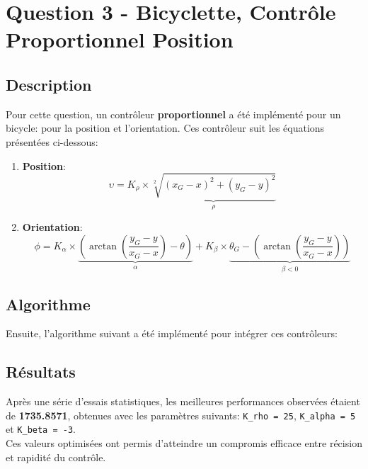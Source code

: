 \documentclass[../CSC_5RO16_TA_TP3.tex]{subfiles}
\begin{document}
\section{Question 3 - Bicyclette, Contrôle Proportionnel Position}

\subsection{Description}
\noindent Pour cette question, un contrôleur \textbf{proportionnel} a été implémenté pour un bicycle: pour la position et l'orientation. Ces contrôleur suit les équations présentées ci-dessous:
\begin{enumerate}
    \item \textbf{Position}:
    \begin{equation}
        \upsilon = K_{\rho} \times \underbrace{\sqrt[2]{(x_{G} - x)^2 + (y_{G} - y)^2}}_{\rho}
    \end{equation}
    \item \textbf{Orientation}:
    \begin{equation}
        \phi = K_{\alpha} \times \underbrace{\left(\arctan\left(\frac{y_{G} - y}{x_{G} - x}\right) - \theta\right)}_{\alpha} + K_{\beta} \times \underbrace{\theta_{G} - \left(\arctan\left(\frac{y_{G} - y}{x_{G} - x}\right)\right)}_{\beta < 0}
    \end{equation}
\end{enumerate}

\subsection{Algorithme}
\noindent Ensuite, l'algorithme suivant a été implémenté pour intégrer ces contrôleurs:
\begin{scriptsize}\mycode
    
\end{scriptsize}

\subsection{Résultats}
\noindent Après une série d'essais statistiques, les meilleures performances observées étaient de \textbf{1735.8571}, obtenues avec les paramètres suivants: \texttt{K\_rho = 25}, \texttt{K\_alpha = 5} et \texttt{K\_beta = -3}.\\

\noindent Ces valeurs optimisées ont permis d'atteindre un compromis efficace entre récision et rapidité du contrôle.
\end{document}
